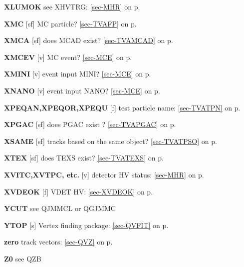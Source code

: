  \item{\bf XLUMOK  }see XHVTRG: \ref{sec-MHR} on p.~\pageref{sec-MHR}\\
 \item{\bf XMC     }[sf] MC particle? \ref{sec-TVAFP} on p.~\pageref{sec-TVAFP}\\
 \item{\bf XMCA    }[sf] does MCAD exist? \ref{sec-TVAMCAD} on p.~\pageref{sec-TVAMCAD}\\
 \item{\bf XMCEV   }[v] MC event? \ref{sec-MCE} on p.~\pageref{sec-MCE}\\
 \item{\bf XMINI   }[v] event input MINI? \ref{sec-MCE} on p.~\pageref{sec-MCE}\\
 \item{\bf XNANO   }[v] event input NANO? \ref{sec-MCE} on p.~\pageref{sec-MCE}\\
 \item{\bf XPEQAN,XPEQOR,XPEQU   }[f] test particle name:
 \ref{sec-TVATPN} on p.~\pageref{sec-TVATPN}\\
 \item{\bf XPGAC   }[sf] does PGAC exist ? \ref{sec-TVAPGAC} on p.~\pageref{sec-TVAPGAC}\\
 \item{\bf XSAME   }[sf] tracks based on the same object? \ref{sec-TVATPSO} on p.~\pageref{sec-TVATPSO}\\
 \item{\bf XTEX    }[sf] does TEXS exist? \ref{sec-TVATEXS} on p.~\pageref{sec-TVATEXS}\\
 \item{\bf XVITC,XVTPC, etc. }[v] detector HV status: \ref{sec-MHR} on p.~\pageref{sec-MHR}\\
 \item{\bf XVDEOK }[f] VDET HV: \ref{sec-XVDEOK} on p.~\pageref{sec-XVDEOK}
 
 \item{\bf YCUT }see QJMMCL or QGJMMC\\
 \item{\bf YTOP   }[s] Vertex finding package: \ref{sec-QVFIT} on p.~\pageref{sec-QVFIT}\\
 \item{\bf zero    }track vectors: \ref{sec-QVZ} on p.~\pageref{sec-QVZ}\\
 \item{\bf Z0 }see QZB
